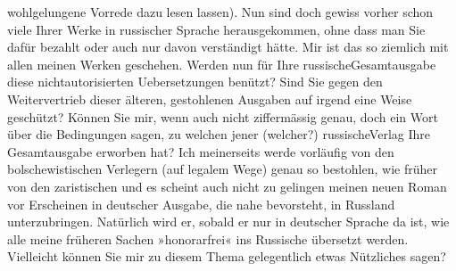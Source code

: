                wohlgelungene Vorrede dazu
               lesen lassen). Nun sind {\pb}doch gewiss vorher schon viele
               Ihrer Werke in russischer Sprache
               herausgekommen, ohne dass man Sie dafür bezahlt oder auch nur \introOben{}davon\introOben{} verständigt hätte. Mir ist das so ziemlich mit allen meinen Werken
               geschehen. Werden nun für Ihre russischeGesamtausgabe diese
               nichtautorisierten Uebersetzungen benützt? Sind Sie gegen den Weitervertrieb dieser
               älteren, gestohlenen Ausgaben auf irgend eine Weise geschützt? Können Sie mir, wenn
               auch nicht ziffermässig genau, doch ein Wort über die Bedingungen sagen, zu welchen
               jener (welcher?) russischeVerlag Ihre Gesamtausgabe erworben hat? Ich
               meinerseits werde vorläufig von den bolschewistischen Verlegern (auf legalem Wege)
               genau so bestohlen, wie früher von den zaristischen und es scheint auch nicht zu
               gelingen meinen neuen Roman
               vor Erscheinen in deutscher Ausgabe, die nahe bevorsteht, in Russland unterzubringen. Natürlich wird er, sobald er nur in
               deutscher Sprache da ist, wie alle meine früheren Sachen »honorarfrei« ins Russische übersetzt werden. Vielleicht können
               Sie mir zu diesem Thema gelegentlich etwas Nützliches sagen?\pend
           
